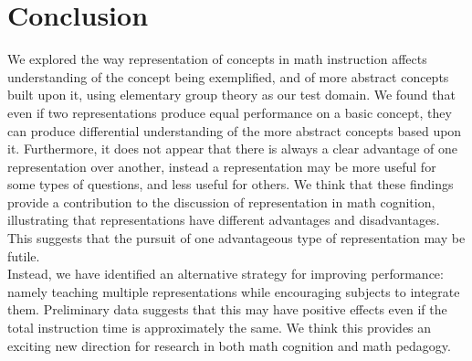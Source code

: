 \documentclass[11pt]{article}
\begin{document}
\section{Conclusion}
We explored the way representation of concepts in math instruction affects understanding of the concept being exemplified, and of more abstract concepts built upon it, using elementary group theory as our test domain. We found that even if two representations produce equal performance on a basic concept, they can produce differential understanding of the more abstract concepts based upon it. Furthermore, it does not appear that there is always a clear advantage of one representation over another, instead a representation may be more useful for some types of questions, and less useful for others. We think that these findings provide a contribution to the discussion of representation in math cognition, illustrating that representations have different advantages and disadvantages. This suggests that the pursuit of one advantageous type of representation may be futile. \\[11pt]
Instead, we have identified an alternative strategy for improving performance: namely teaching multiple representations while encouraging subjects to integrate them. Preliminary data suggests that this may have positive effects even if the total instruction time is approximately the same. We think this provides an exciting new direction for research in both math cognition and math pedagogy. 
 




\newpage
\setcounter{secnumdepth}{-1}
\end{document}
